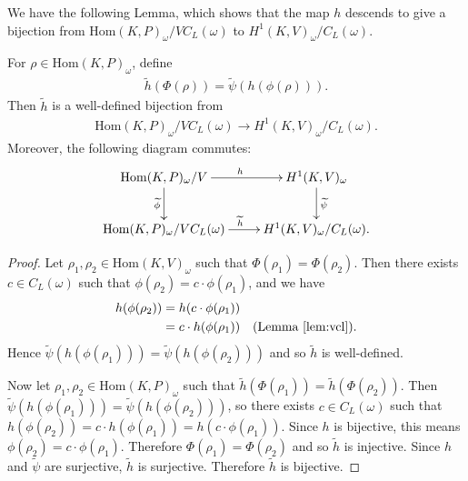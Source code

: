 	We have the following Lemma, which shows that the map $h$ descends to give a bijection from $\mathrm{Hom}(K, P)_\omega /VC_L(\omega)$ to $H^1(K, V)_{\omega}/C_L(\omega)$.

\begin{lemma}
	For $\rho \in \mathrm{Hom}(K, P)_\omega$, define
	\begin{align*}
		\widetilde{h}(\Phi(\rho)) = \widetilde{\psi}(h(\phi(\rho))).
	\end{align*}
	Then $\widetilde{h}$ is a well-defined bijection from
	\begin{align*}
		\mathrm{Hom}(K, P)_\omega / VC_L(\omega) \rightarrow H^1(K, V)_\omega/C_L(\omega).
	\end{align*}
	Moreover, the following diagram commutes:
  \begin{align*}
    \xymatrix{
		\mathrm{Hom}(K, P)_{\omega}/V \ar[r]^h \ar[d]_{\widetilde{\phi}} & H^{1}(K, V)_\omega \ar[d]^{\widetilde{\psi}} \\
		\mathrm{Hom}(K, P)_{\omega}/VC_L(\omega) \ar[r]^{\widetilde{h}} & H^{1}(K, V)_\omega/C_L(\omega).
    }
  \end{align*}
\end{lemma}
\begin{proof}
Let $\rho_1, \rho_2 \in \mathrm{Hom}(K, V)_\omega$ such that $\Phi(\rho_1) = \Phi(\rho_2)$. Then there exists $c \in C_L(\omega)$ such that $\phi(\rho_2) = c\cdot\phi(\rho_1)$, and we have
\begin{align*}
	h(\phi(\rho_2)) &= h(c \cdot\phi(\rho_1)) \\
	&= c \cdot h(\phi(\rho_1))\quad(\textrm{Lemma }\ref{lem:vcl}). 
\end{align*}
Hence $\widetilde{\psi}(h(\phi(\rho_1))) = \widetilde{\psi}(h(\phi(\rho_2)))$ and so $\widetilde{h}$ is well-defined.

Now let $\rho_1, \rho_2\in \mathrm{Hom}(K, P)_\omega$ such that $\widetilde{h}\left(\Phi(\rho_1)\right) = \widetilde{h}\left(\Phi(\rho_2)\right)$. Then $\widetilde{\psi}(h(\phi(\rho_1))) = \widetilde{\psi}(h(\phi(\rho_2)))$, so there exists $c\in C_L(\omega)$ such that $h(\phi(\rho_2)) = c\cdot h(\phi(\rho_1)) = h(c\cdot\phi(\rho_1))$. Since $h$ is bijective, this means $\phi(\rho_2) = c\cdot\phi(\rho_1)$. Therefore $\Phi(\rho_1) = \Phi(\rho_2)$ and so $\widetilde{h}$ is injective. Since $h$ and $\widetilde{\psi}$ are surjective, $\widetilde{h}$ is surjective. Therefore $\widetilde{h}$ is bijective.
\end{proof}

